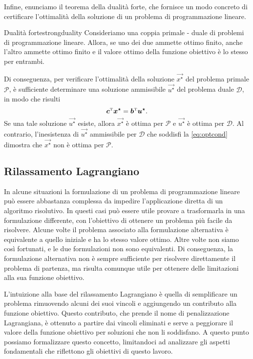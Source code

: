 Infine, enunciamo il teorema della dualità forte, che fornisce un modo concreto di certificare l'ottimalità della
soluzione di un problema di programmazione lineare.

\begin{theorem}{Dualità forte}{strongduality}
    Consideriamo una coppia primale - duale di problemi di programmazione
    lineare. Allora, se uno dei due ammette ottimo finito, anche l'altro
    ammette ottimo finito e il valore ottimo della funzione obiettivo è lo
    stesso per entrambi.
\end{theorem}
\noindent
Di conseguenza, per verificare l'ottimalità della soluzione \( \vec{x^{\star}} \) del problema primale \( \mathcal{P}
\), è sufficiente determinare una soluzione ammissibile \( \vec{u^{\star}} \) del problema duale \( \mathcal{D} \), in
modo che risulti
\begin{equation}\label{eq:optcond}
    \bm{c}^{\scriptscriptstyle\mathrm{T}}\bm{x^{\star}} = \bm{b}^{\scriptscriptstyle\mathrm{T}}\bm{u^{\star}}.
\end{equation}
Se una tale soluzione \( \vec{u^{\star}} \) esiste, allora \( \vec{x^{\star}} \) è ottima per \( \mathcal{P} \) e \(
\vec{u^{\star}} \) è ottima per \( \mathcal{D} \). Al contrario, l'inesistenza di \( \vec{u^{\star}} \) ammissibile per
\( \mathcal{D} \) che soddisfi la \eqref{eq:optcond} dimostra che \( \vec{x^{\star}} \) non è ottima per \( \mathcal{P}
\).

\subsection{Rilassamento Lagrangiano}
\label{sec:lr}

In alcune situazioni la formulazione di un problema di programmazione lineare può essere abbastanza complessa da
impedire l'applicazione diretta di un algoritmo risolutivo. In questi casi può essere utile provare a trasformarla in
una formulazione differente, con l'obiettivo di ottenere un problema più facile da risolvere. Alcune volte il problema
associato alla formulazione alternativa è equivalente a quello iniziale e ha lo stesso valore ottimo. Altre volte non siamo
così fortunati, e le due formulazioni non sono equivalenti. Di conseguenza, la formulazione alternativa non è sempre
sufficiente per risolvere direttamente il problema di partenza, ma risulta comunque utile per ottenere delle limitazioni
alla sua funzione obiettivo.

L'intuizione alla base del rilassamento Lagrangiano è quella di semplificare un problema rimuovendo alcuni dei suoi
vincoli e aggiungendo un contributo alla funzione obiettivo. Questo contributo, che prende il nome di penalizzazione
Lagrangiana, è ottenuto a partire dai vincoli eliminati e serve a peggiorare il valore della funzione obiettivo per
soluzioni che non li soddisfano.
A questo punto possiamo formalizzare questo concetto, limitandoci ad analizzare gli aspetti fondamentali che riflettono
gli obiettivi di questo lavoro.

